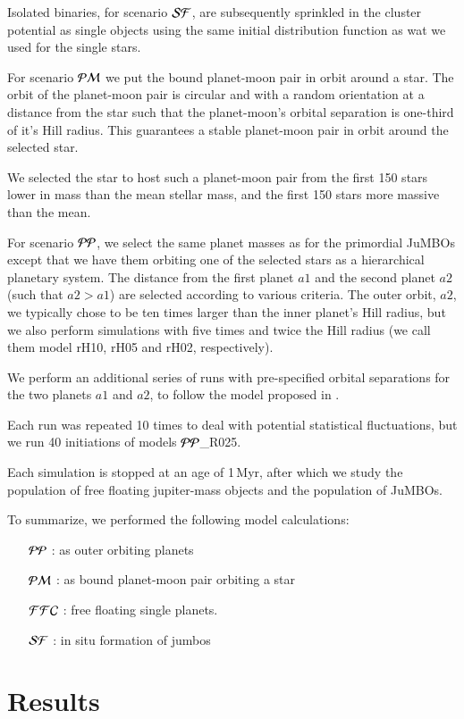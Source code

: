 \documentclass[aa]{aa}
\newcommand{\jumbos}{\mbox{JuMBOs}}
\begin{document}
Isolated binaries, for scenario ${\cal SF}$, are subsequently sprinkled
in the cluster potential as single objects using the same initial
distribution function as wat we used for the single stars.

For scenario ${\cal PM}$ we put the bound planet-moon pair in orbit
around a star.  The orbit of the planet-moon pair is circular and with
a random orientation at a distance from the star such that the
planet-moon's orbital separation is one-third of it's Hill radius.
This guarantees a stable planet-moon pair in orbit around the selected
star.

We selected the star to host such a planet-moon pair from the first
150 stars lower in mass than the mean stellar mass, and the first 150
stars more massive than the mean.

For scenario ${\cal PP}$, we select the same planet masses as for the
primordial \jumbos\, except that we have them orbiting one of the
selected stars as a hierarchical planetary system. The distance from
the first planet $a1$ and the second planet $a2$ (such that $a2>a1$)
are selected according to various criteria. The outer orbit, $a2$, we
typically chose to be ten times larger than the inner planet's Hill
radius, but we also perform simulations with five times and twice the
Hill radius (we call them model rH10, rH05 and rH02, respectively).

We perform an additional series of runs with pre-specified orbital
separations for the two planets $a1$ and $a2$, to follow the model
proposed in \cite{2023arXiv231006016W}.

Each run was repeated 10 times to deal with potential statistical
fluctuations, but we run 40 initiations of models ${\cal PP}$\_R025.

Each simulation is stopped at an age of 1\,Myr, after which we study
the population of free floating jupiter-mass objects and the
population of \jumbos.

To summarize, we performed the following model calculations:
\begin{itemize}
\item[${\cal PP}$]: as outer orbiting planets
\item[${\cal PM}$]: as bound planet-moon pair orbiting a star
\item[${\cal FFC}$]: free floating single planets.
\item[${\cal SF}$]: in situ formation of jumbos
\end{itemize}

\section{Results}
\end{document}
